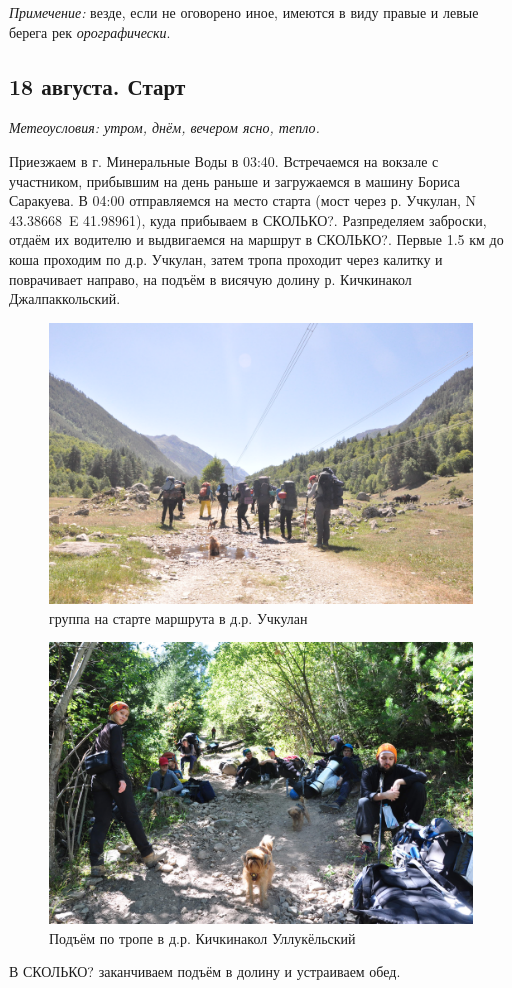 \textit{Примечение:} везде, если не оговорено иное, имеются в виду правые и левые берега рек \textit{орографически}.
\subsection{18 августа. Старт}
\textit{Метеоусловия: утром, днём, вечером ясно, тепло.}

Приезжаем в г. Минеральные Воды в 03:40. Встречаемся на вокзале с участником, прибывшим на день раньше и загружаемся в машину Бориса Саракуева. В 04:00 отправляемся на место старта (мост через р. Учкулан, N 43.38668\degree~E 41.98961\degree), куда прибываем в \alert{СКОЛЬКО?}. Разпределяем заброски, отдаём их водителю и выдвигаемся на маршрут в \alert{СКОЛЬКО?}. Первые 1.5 км до коша проходим по д.р. Учкулан, затем тропа проходит через калитку и поврачивает направо, на подъём в висячую долину р. Кичкинакол Джалпаккольский.

\begin{figure}[h!]
	\centering
	\includegraphics[width=0.7\linewidth]{../pics/DSC_0412}
	\caption{группа на старте маршрута в д.р. Учкулан}
	\label{fig:uchkulan}
\end{figure}


\begin{figure}[h!]
	\centering
	\includegraphics[width=0.7\linewidth]{../pics/DSC_0436}
	\caption{Подъём по тропе в д.р. Кичкинакол Уллукёльский}
	\label{fig:DSC_0436}
\end{figure}
В \alert{СКОЛЬКО?} заканчиваем подъём в долину и устраиваем обед.

